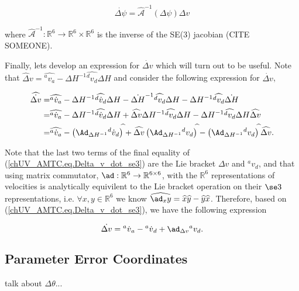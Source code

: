 \begin{equation}\label{chUV_AMTC.eq.delta_psi_dot}
\dot{\Delta \psi} = \hat{\mathcal{A}}^{-1}(\Delta \psi) \Delta v
\end{equation}

\noindent where
$\hat{\mathcal{A}}^{-1}:\mathbb{R}^6\to\mathbb{R}^6\times\mathbb{R}^6$ is
the inverse of the SE(3) jacobian (CITE SOMEONE).  

Finally, lets develop an expression for $\dot{\Delta v}$ which will
turn out to be useful.  Note that $\widehat\Delta
v=\widehat{{^a}v_a}-\Delta H^{-1}\widehat{{^d}v_d}\Delta H$ and
consider the following expression for $\dot{\Delta v}$,

\begin{align}
\widehat{\dot{\Delta v}}
 =&\widehat{{^a}\dot{v}_a}
  -\Delta H^{-1}\widehat{{^d}\dot{v}_d}\Delta H
  -\dot{\Delta H}^{-1}\widehat{{^d}v_d}\Delta H
  -\Delta H^{-1}\widehat{{^d}v_d}\dot{\Delta H}
\nonumber \\
 =&\widehat{{^a}\dot{v}_a}
  -\Delta H^{-1}\widehat{{^d}\dot{v}_d}\Delta H
  +\widehat{\Delta v}\Delta H^{-1}\widehat{{^d}v_d}\Delta H
  -\Delta H^{-1}\widehat{{^d}v_d}\Delta H\widehat{\Delta v}
\nonumber \\
 =&\widehat{{^a}\dot{v}_a}
  -\left(\Ad_{\Delta H^{-1}}{^d}\dot{v}_d\right)^{\widehat{}}
  +\widehat{\Delta v}\left(\Ad_{\Delta H^{-1}}{^d}v_d\right)^{\widehat{}}
  -\left(\Ad_{\Delta H^{-1}}{^d}v_d\right)^{\widehat{}}\widehat{\Delta v}.
\label{chUV_AMTC.eq.Delta_v_dot_se3}
\end{align}


\noindent Note that the last two terms of the final equality of
(\ref{chUV_AMTC.eq.Delta_v_dot_se3}) are the Lie bracket $\Delta v$
and ${^a}v_d$, and that using matrix commutator,
$\ad:\mathbb{R}^6\to\mathbb{R}^{6\times 6}$, with the $\mathbb{R}^6$
representations of velocities is analytically equivilent to the Lie
bracket operation on their $\se3$ representations, i.e. $\forall
x,y\in\mathbb{R}^6$ we know $\widehat{\ad_x
  y}=\widehat{x}\widehat{y}-\widehat{y} \widehat{x}$. Therefore, based
on (\ref{chUV_AMTC.eq.Delta_v_dot_se3}), we have the following
expression

\begin{equation}\label{chUV_ATMC.eq.delta_v_dot}
\dot{\Delta v} = {^a}\dot{v}{_a}-{^a}\dot{v}{_d}+\ad_{\Delta v} {^a}v_d.
\end{equation}


\subsection{Parameter Error Coordinates}
\label{chUV_AMTC.sec.param_errCoord}

talk about $\Delta \theta$...